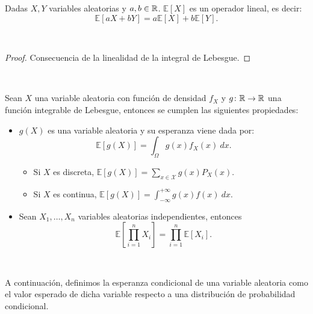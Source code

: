 \documentclass[oneside,openright,titlepage,numbers=noenddot,openany,headinclude,footinclude=true,
cleardoublepage=empty,abstractoff,BCOR=5mm,paper=a4,fontsize=12pt,main=spanish]{scrreprt}
\begin{document}
\begin{proposition}
Dadas $X,Y$ variables aleatorias y $a,b\in \mathbb{R}$. $\mathbb{E}[X]$ es un operador lineal, es decir: $$\mathbb{E}[aX+bY]=a\mathbb{E}[X]+b\mathbb{E}[Y].$$ 
\end{proposition}\

\begin{proof}
Consecuencia de la linealidad de la integral de Lebesgue.
\end{proof}\

\begin{proposition}
Sean $X$ una variable aleatoria con función de densidad $f_X$ y $g\colon \mathbb{R} \to \mathbb{R}$ una función integrable de Lebesgue, entonces se cumplen las siguientes propiedades:
\begin{itemize}
    \item $g(X)$ es una variable aleatoria y su esperanza viene dada por: $$\mathbb{E}[g(X)]=\int_\Omega g(x)f_X(x) \ dx.$$ 
    \begin{itemize}
        \item Si $X$ es discreta, $\displaystyle \mathbb{E}[g(X)]=\sum_{x\in \mathcal{X}} g(x)P_X(x).$
        \item Si $X$ es continua, $\displaystyle \mathbb{E}[g(X)]=\int_{-\infty}^{+\infty}g(x) f(x) \ dx.$
    \end{itemize}
    \item Sean $X_1,\dots,X_n$ variables aleatorias independientes, entonces $$\mathbb{E}\left[\prod_{i=1}^n X_i \right]=\prod_{i=1}^n \mathbb{E}[X_i].$$
\end{itemize}
\end{proposition}\

A continuación, definimos la esperanza condicional de una variable aleatoria como el valor esperado de dicha variable respecto a una distribución de probabilidad condicional.\\
\end{document}
